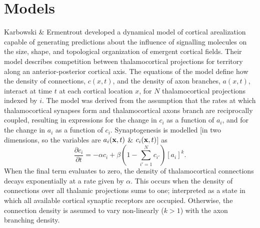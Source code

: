 \documentclass[9pt,twocolumn,twoside,lineno]{pnas-new}
\begin{document}
\section*{Models}

Karbowski \& Ermentrout \citep{karbowski_model_2004} developed a dynamical
model of cortical arealization capable of generating predictions about the
influence of signalling molecules on the size, shape, and topological
organization of emergent cortical fields. Their model describes competition
between thalamocortical projections for territory along an anterior-posterior
cortical axis. The equations of the model define how the density of
connections, $c(x,t)$, and the density of axon branches, $a(x,t)$, interact at time $t$
at each cortical location $x$, for $N$ thalamocortical projections indexed by
$i$.
%
The model was derived from the assumption that the rates at which
thalamocortical synapses form and thalamocortical axons branch are
reciprocally coupled, resulting in expressions for the change in $c_i$ as a
function of $a_i$, and for the change in $a_i$ as a function of
$c_i$. Synaptogenesis is modelled [in two dimensions, so the variables are
$a_i(\mathbf{x},t)$ \& $c_i(\mathbf{x},t)$] as
%
\begin{equation} \label{eq:dc}
\frac{\partial c_i}{\partial t} =-\alpha c_i +\beta  \left(1 - \sum_{i'=1}^{N} c_{i'}\right)[a_i]^k.
\end{equation}
%
When the final term evaluates to zero, the density of thalamocortical
connections decays exponentially at a rate given by $\alpha$. This occurs when
the density of connections over all thalamic projections sums to one;
interpreted as a state in which all available cortical synaptic receptors are
occupied. Otherwise, the connection density is assumed to vary non-linearly
($k>1$) with the axon branching density.
\end{document}
